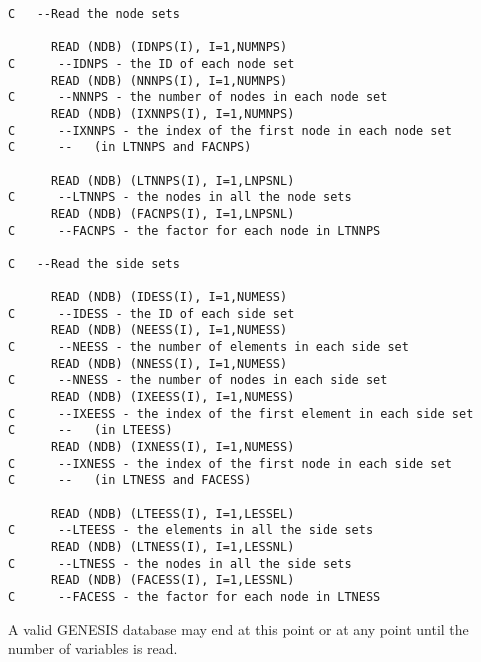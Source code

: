\newpage
\begin{verbatim}
C   --Read the node sets

      READ (NDB) (IDNPS(I), I=1,NUMNPS)
C      --IDNPS - the ID of each node set
      READ (NDB) (NNNPS(I), I=1,NUMNPS)
C      --NNNPS - the number of nodes in each node set
      READ (NDB) (IXNNPS(I), I=1,NUMNPS)
C      --IXNNPS - the index of the first node in each node set
C      --   (in LTNNPS and FACNPS)

      READ (NDB) (LTNNPS(I), I=1,LNPSNL)
C      --LTNNPS - the nodes in all the node sets
      READ (NDB) (FACNPS(I), I=1,LNPSNL)
C      --FACNPS - the factor for each node in LTNNPS

C   --Read the side sets

      READ (NDB) (IDESS(I), I=1,NUMESS)
C      --IDESS - the ID of each side set
      READ (NDB) (NEESS(I), I=1,NUMESS)
C      --NEESS - the number of elements in each side set
      READ (NDB) (NNESS(I), I=1,NUMESS)
C      --NNESS - the number of nodes in each side set
      READ (NDB) (IXEESS(I), I=1,NUMESS)
C      --IXEESS - the index of the first element in each side set
C      --   (in LTEESS)
      READ (NDB) (IXNESS(I), I=1,NUMESS)
C      --IXNESS - the index of the first node in each side set
C      --   (in LTNESS and FACESS)

      READ (NDB) (LTEESS(I), I=1,LESSEL)
C      --LTEESS - the elements in all the side sets
      READ (NDB) (LTNESS(I), I=1,LESSNL)
C      --LTNESS - the nodes in all the side sets
      READ (NDB) (FACESS(I), I=1,LESSNL)
C      --FACESS - the factor for each node in LTNESS
\end{verbatim}
\newpage

A valid GENESIS database may end at this point or at any point until the
number of variables is read. 

